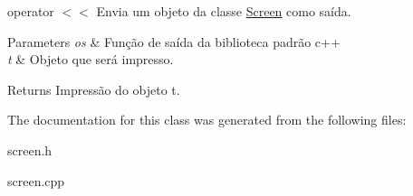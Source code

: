operator $<$$<$ Envia um objeto da classe \hyperlink{class_screen}{Screen} como saída. 


\begin{DoxyParams}{Parameters}
{\em os} & Função de saída da biblioteca padrão c++ \\
\hline
{\em t} & Objeto que será impresso. \\
\hline
\end{DoxyParams}
\begin{DoxyReturn}{Returns}
Impressão do objeto t. 
\end{DoxyReturn}


The documentation for this class was generated from the following files\+:\begin{DoxyCompactItemize}
\item 
screen.\+h\item 
screen.\+cpp\end{DoxyCompactItemize}
